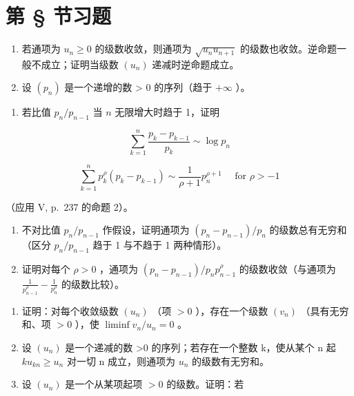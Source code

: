 \section*{第 \S{} 节习题}
{}

\begin{enumerate}
\def\labelenumi{\arabic{enumi})}
\item
  若通项为 \(u_{n} \geqslant 0\) 的级数收敛，则通项为 \(\sqrt{u_n u_{n+1}}\) 的级数也收敛。逆命题一般不成立；证明当级数 \((u_n)\) 递减时逆命题成立。
\item
  设 \((p_{n})\) 是一个递增的数 \textgreater{} 0 的序列（趋于 \(+\infty\) ）。
\end{enumerate}

\begin{enumerate}
\def\labelenumi{\alph{enumi})}
\tightlist
\item
  若比值 \(p_n / p_{n-1}\) 当 \(n\) 无限增大时趋于 1，证明
\end{enumerate}

\[
\sum_ {k = 1} ^ {n} \frac {p _ {k} - p _ {k - 1}}{p _ {k}} \sim \log p _ {n}
\]

\[
\sum_ {k = 1} ^ {n} p _ {k} ^ {\rho} (p _ {k} - p _ {k - 1}) \sim \frac {1}{\rho + 1} p _ {n} ^ {\rho + 1} \quad \text { for } \rho > - 1
\]

（应用 V, p.~237 的命题 2）。

\begin{enumerate}
\def\labelenumi{\alph{enumi})}
\setcounter{enumi}{1}
\item
  不对比值 \(p_{n}/p_{n-1}\) 作假设，证明通项为 \((p_{n}-p_{n-1})/p_{n}\) 的级数总有无穷和（区分 \(p_{n}/p_{n-1}\) 趋于 1 与不趋于 1 两种情形）。
\item
  证明对每个 \(\rho > 0\) ，通项为 \((p_n - p_{n-1}) / p_n p_{n-1}^\rho\) 的级数收敛（与通项为 \(\frac{1}{p_{n-1}^\rho} - \frac{1}{p_n^\rho}\) 的级数比较）。
\end{enumerate}

\begin{enumerate}
\def\labelenumi{\arabic{enumi})}
\setcounter{enumi}{2}
\item
  证明：对每个收敛级数 \((u_{n})\) （项 \(>0\) ），存在一个级数 \((v_{n})\) （具有无穷和、项 \(>0\) ），使 \(\liminf v_n / u_n = 0\) 。
\item
  设 \((u_{n})\) 是一个递减的数 \textgreater0 的序列；若存在一个整数 k，使从某个 n 起 \(ku_{kn} \geqslant u_{n}\) 对一切 n 成立，则通项为 \(u_{n}\) 的级数有无穷和。
\item
  设 \((u_{n})\) 是一个从某项起项 \(>0\) 的级数。证明：若
\end{enumerate}

